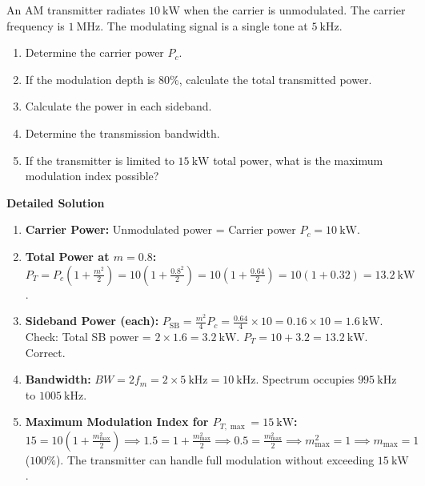 \documentclass[11pt]{article}
\begin{document}
\begin{exoresolu}
An AM transmitter radiates $10\ \mathrm{kW}$ when the carrier is unmodulated. The carrier frequency is $1\ \mathrm{MHz}$. The modulating signal is a single tone at $5\ \mathrm{kHz}$.
\begin{enumerate}
\item Determine the carrier power $P_c$.
\item If the modulation depth is $80\%$, calculate the total transmitted power.
\item Calculate the power in each sideband.
\item Determine the transmission bandwidth.
\item If the transmitter is limited to $15\ \mathrm{kW}$ total power, what is the maximum modulation index possible?
\end{enumerate}
\tcblower
\textbf{Detailed Solution}
\begin{enumerate}
\item \textbf{Carrier Power:} Unmodulated power = Carrier power $P_c = 10\ \mathrm{kW}$.

\item \textbf{Total Power at $m=0.8$:}
$P_T = P_c \left(1 + \frac{m^2}{2}\right) = 10 \left(1 + \frac{0.8^2}{2}\right) = 10 \left(1 + \frac{0.64}{2}\right) = 10 (1 + 0.32) = 13.2\ \mathrm{kW}$.

\item \textbf{Sideband Power (each):}
$P_{\mathrm{SB}} = \frac{m^2}{4} P_c = \frac{0.64}{4} \times 10 = 0.16 \times 10 = 1.6\ \mathrm{kW}$.
Check: Total SB power = $2 \times 1.6 = 3.2\ \mathrm{kW}$. $P_T = 10 + 3.2 = 13.2\ \mathrm{kW}$. Correct.

\item \textbf{Bandwidth:}
$BW = 2 f_m = 2 \times 5\ \mathrm{kHz} = 10\ \mathrm{kHz}$.
Spectrum occupies $995\ \mathrm{kHz}$ to $1005\ \mathrm{kHz}$.

\item \textbf{Maximum Modulation Index for $P_{T,\max} = 15\ \mathrm{kW}$:}
$15 = 10 \left(1 + \frac{m_{\max}^2}{2}\right) \implies 1.5 = 1 + \frac{m_{\max}^2}{2} \implies 0.5 = \frac{m_{\max}^2}{2} \implies m_{\max}^2 = 1 \implies m_{\max} = 1$ ($100\%$).
The transmitter can handle full modulation without exceeding $15\ \mathrm{kW}$.
\end{enumerate}
\end{exoresolu}
\end{document}
